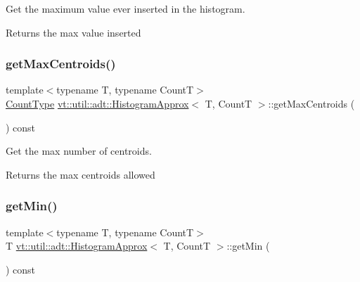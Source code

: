 Get the maximum value ever inserted in the histogram. 

\begin{DoxyReturn}{Returns}
the max value inserted 
\end{DoxyReturn}
\mbox{\label{structvt_1_1util_1_1adt_1_1_histogram_approx_a5b6af36eb1219d09bf17349731ed66ff}} 
\subsubsection{\texorpdfstring{get\+Max\+Centroids()}{getMaxCentroids()}}
{\footnotesize\ttfamily template$<$typename T, typename CountT$>$ \\
\hyperlink{structvt_1_1util_1_1adt_1_1_histogram_approx_aa2fb74665588d311da76dd821f2912c6}{Count\+Type} \hyperlink{structvt_1_1util_1_1adt_1_1_histogram_approx}{vt\+::util\+::adt\+::\+Histogram\+Approx}$<$ T, CountT $>$\+::get\+Max\+Centroids (\begin{DoxyParamCaption}{ }\end{DoxyParamCaption}) const\hspace{0.3cm}{\ttfamily [inline]}}



Get the max number of centroids. 

\begin{DoxyReturn}{Returns}
the max centroids allowed 
\end{DoxyReturn}
\mbox{\label{structvt_1_1util_1_1adt_1_1_histogram_approx_ab024713bdb28ef694096f3865236faa3}} 
\subsubsection{\texorpdfstring{get\+Min()}{getMin()}}
{\footnotesize\ttfamily template$<$typename T, typename CountT$>$ \\
T \hyperlink{structvt_1_1util_1_1adt_1_1_histogram_approx}{vt\+::util\+::adt\+::\+Histogram\+Approx}$<$ T, CountT $>$\+::get\+Min (\begin{DoxyParamCaption}{ }\end{DoxyParamCaption}) const\hspace{0.3cm}{\ttfamily [inline]}}



